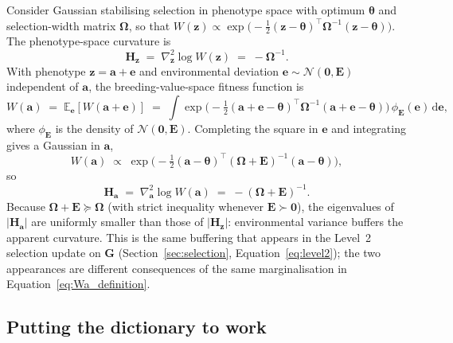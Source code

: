 \documentclass[9pt,twocolumn,twoside,lineno]{gsajnl}
\newcommand{\vect}[1]{\boldsymbol{#1}}
\newcommand{\mat}[1]{\mathbf{#1}}
\begin{document}
Consider Gaussian stabilising selection in phenotype space with optimum $\bm{\theta}$ and selection-width matrix $\bm{\Omega}$, so that $W(\vect{z}) \propto \exp\!\big(\!-\tfrac{1}{2}(\vect{z}-\bm{\theta})^{\top}\bm{\Omega}^{-1}(\vect{z}-\bm{\theta})\big)$. The phenotype-space curvature is
\[
\mat{H}_{\vect{z}} \;=\; \nabla^2_{\vect{z}}\log W(\vect{z}) \;=\; -\bm{\Omega}^{-1}.
\]
With phenotype $\vect{z} = \vect{a}+\vect{e}$ and environmental deviation $\vect{e}\sim\mathcal{N}(\vect{0},\mat{E})$ independent of $\vect{a}$, the breeding-value-space fitness function is
\[
W(\vect{a}) \;=\; \mathbb{E}_{\vect{e}}[W(\vect{a}+\vect{e})]
\;=\; \int \exp\!\big(\!-\tfrac{1}{2}(\vect{a}+\vect{e}-\bm{\theta})^{\top}\bm{\Omega}^{-1}(\vect{a}+\vect{e}-\bm{\theta})\big)\,\phi_{\mat{E}}(\vect{e})\,\mathrm{d}\vect{e},
\]
where $\phi_{\mat{E}}$ is the density of $\mathcal{N}(\vect{0},\mat{E})$. Completing the square in $\vect{e}$ and integrating gives a Gaussian in $\vect{a}$,
\[
W(\vect{a}) \;\propto\; \exp\!\Big(\!-\tfrac{1}{2}(\vect{a}-\bm{\theta})^{\top}(\bm{\Omega}+\mat{E})^{-1}(\vect{a}-\bm{\theta})\Big),
\]
so
\[
\mat{H}_{\vect{a}} \;=\; \nabla^2_{\vect{a}}\log W(\vect{a}) \;=\; -(\bm{\Omega}+\mat{E})^{-1}.
\]
Because $\bm{\Omega}+\mat{E}\succeq\bm{\Omega}$ (with strict inequality whenever $\mat{E}\succ\mat{0}$), the eigenvalues of $|\mat{H}_{\vect{a}}|$ are uniformly smaller than those of $|\mat{H}_{\vect{z}}|$: environmental variance buffers the apparent curvature. This is the same buffering that appears in the Level~2 selection update on $\mat{G}$ (Section~\ref{sec:selection}, Equation~\eqref{eq:level2}); the two appearances are different consequences of the same marginalisation in Equation~\eqref{eq:Wa_definition}.

\subsection{Putting the dictionary to work}
\end{document}
